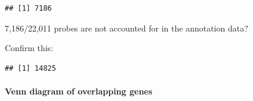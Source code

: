 \documentclass[]{article}
\newenvironment{Shaded}{\begin{snugshade}}{\end{snugshade}}
\newcommand{\KeywordTok}[1]{\textcolor[rgb]{0.13,0.29,0.53}{\textbf{#1}}}
\newcommand{\StringTok}[1]{\textcolor[rgb]{0.31,0.60,0.02}{#1}}
\newcommand{\OperatorTok}[1]{\textcolor[rgb]{0.81,0.36,0.00}{\textbf{#1}}}
\newcommand{\NormalTok}[1]{#1}
\let\oldparagraph\paragraph
\renewcommand{\paragraph}[1]{\oldparagraph{#1}\mbox{}}
\begin{document}
\begin{verbatim}
## [1] 7186
\end{verbatim}

7,186/22,011 probes are not accounted for in the annotation data?

Confirm this:

\begin{Shaded}
\end{Shaded}

\begin{verbatim}
## [1] 14825
\end{verbatim}

\paragraph{Venn diagram of overlapping
genes}\label{venn-diagram-of-overlapping-genes}
\end{document}
